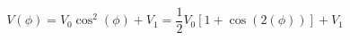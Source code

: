 \begin{equation}
\label{eq:Photodiode_Voltage}
V(\phi) = V_{0} \cos^2(\phi)+ V_{1} = \frac{1}{2}V_0\left[1 + \cos(2 (\phi))\right]+ V_1
\end{equation}